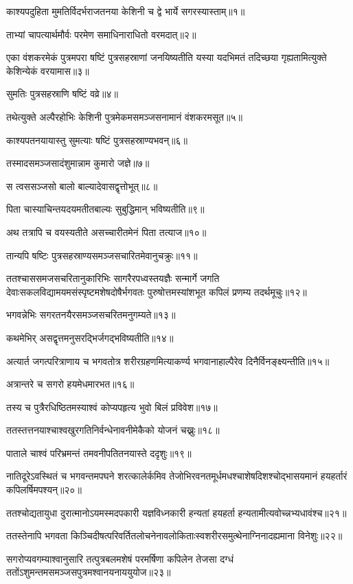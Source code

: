 \begin{flushleft}

काश्यपदुहिता मुमतिर्विदर्भराजतनया केशिनी च द्वे भार्ये सगरस्यास्ताम्॥१॥

ताभ्यां चापत्यार्थमौर्वः परमेण समाधिनाराधितो वरमदात्॥२॥

एका वंशकरमेकं पुत्रमपरा षष्टिं पुत्रसहस्राणां जनयिष्यतीति यस्या यदभिमतं तदिच्छया गृह्यतामित्युक्ते केशिन्येकं वरयामास॥३॥

सुमतिः पुत्रसहस्राणि षष्टिं वव्रे॥४॥

तथेत्युक्ते अल्पैरहोभिः केशिनी पुत्रमेकमसमञ्जसनामानं वंशकरमसूत॥५॥

काश्यपतनयायास्तु सुमत्याः षष्टिं पुत्रसहस्राण्यभवन्॥६॥

तस्मादसमञ्जसादंशुमान्नाम कुमारो जज्ञे॥७॥

स त्वससञ्जसो बालो बाल्यादेवासद्वृत्तोभूत्॥८॥

पिता चास्याचिन्तयदयमतीतबाल्यः सुबुद्धिमान् भविष्यतीति॥९॥

अथ तत्रापि च वयस्यतीते असच्चारीतमेनं पिता तत्याज॥१०॥

तान्यपि षष्टिः पुत्रसहस्राण्यसमञ्जसचारितमेवानुचक्रुः॥११॥

ततश्चाससमजसचरितानुकारिभिः सागरैरपध्वस्तयज्ञैः सन्मार्गे जगति देवाःसकलविद्यामयमसंस्पृष्टमशेषदोषैर्भगवतः पुरुषोत्तमस्यांशभूत कपिलं प्रणम्य तदर्थमूचुः॥१२॥

भगवन्नेभिः सगरतनयैरसमञ्जसचरितमनुगम्यते॥१३॥

कथमेभिर् असद्वृत्तमनुसरद्भिर्जगद्भविष्यतीति॥१४॥

अत्यार्त जगत्परित्राणाय च भगवतोत्र शरीरग्रहणमित्याकर्ण्य भगवानाहाल्पैरेव दिनैर्विनङ्क्ष्यन्तीति॥१५॥

अत्रान्तरे च सगरो हयमेधमारभत॥१६॥

तस्य च पुत्रैरधिष्ठितमस्याश्वं कोप्यपहृत्य भुवो बिलं प्रविवेश॥१७॥

ततस्तत्तनयाश्चाश्वखुरगतिनिर्वन्धेनावनीमेकैको योजनं चख्नुः॥१८॥

पाताले चाश्वं परिभ्रमन्तं तमवनीपतितनयास्ते ददृशुः॥१९॥

नातिदूरेऽवस्थितं च भगवन्तमपघने शरत्कालेर्कमिव तेजोभिरवनतमूर्धमधश्चाशेषदिशश्चोद्भासयमानं हयहर्तारं कपिलर्षिमपश्यन्॥२०॥

ततश्चोद्यतायुधा दुरात्मानोऽयमस्मदपकारी यज्ञविध्नकारी हन्यतां हयहर्ता हन्यतामीत्यवोच्न्नभ्यधावंश्च॥२१॥

ततस्तेनापि भगवता किञ्चिदीषत्परिवर्तितलोचनेनावलोकिताःस्वशरीरसमुत्थेनाग्निनादह्यमाना विनेशुः॥२२॥

सगरोप्यवगम्याश्वानुसारि तत्पुत्रबलमशेषं परमर्षिणा कपिलेन तेजसा दग्धं ततोंऽशुमन्तमसमञ्जसपुत्रमश्वानयनाययुयोज॥२३॥


\end{flushleft}
